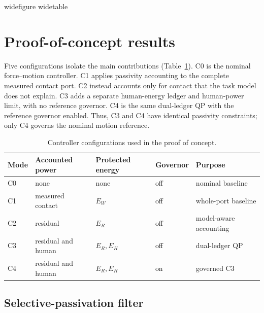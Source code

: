 
\providecommand{\figwidth}{\columnwidth}
\providecommand{\FloatBarrier}{}
\ifcsname widefigure\endcsname\else
  \newenvironment{widefigure}[1][!htbp]
    {\begin{figure}[#1]}
    {\end{figure}}
\fi
\ifcsname widetable\endcsname\else
  \newenvironment{widetable}[1][!htbp]
    {\begin{table}[#1]}
    {\end{table}}
\fi

\section{Proof-of-concept results}
\label{sec:results}

Five configurations isolate the main contributions (Table~\ref{tab:roles}).
C0 is the nominal force--motion controller. C1 applies passivity accounting
to the complete measured contact port. C2 instead accounts only for contact
that the task model does not explain. C3 adds a separate human-energy ledger
and human-power limit, with no reference governor. C4 is the same dual-ledger
QP with the reference governor enabled. Thus, C3 and C4 have identical
passivity constraints; only C4 governs the nominal motion reference.

\begin{widetable}[!htbp]
\centering
\caption{Controller configurations used in the proof of concept.}
\label{tab:roles}
\small
\setlength{\tabcolsep}{4pt}
\begin{tabular}{lllll}
\toprule
Mode & Accounted power & Protected energy & Governor & Purpose \\
\midrule
C0 & none & none & off & nominal baseline \\
C1 & measured contact & $E_W$ & off & whole-port baseline \\
C2 & residual & $E_R$ & off & model-aware accounting \\
C3 & residual and human & $E_R,E_H$ & off & dual-ledger QP \\
C4 & residual and human & $E_R,E_H$ & on & governed C3 \\
\bottomrule
\end{tabular}
\end{widetable}

\subsection*{Selective-passivation filter}

